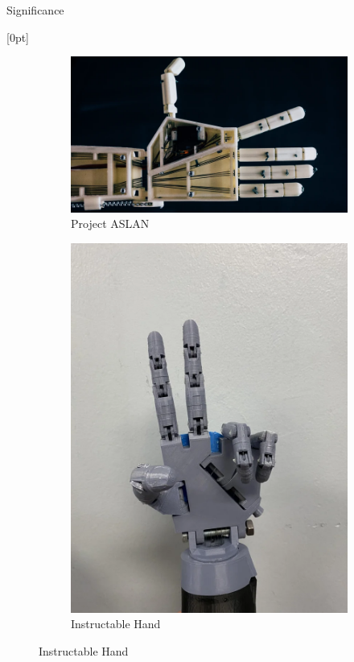 \documentclass[final, 20pt]{beamer}
\newlength{\colwidth}
\newlength{\twocolwidth}
\begin{document}
\begin{frame}[t]
\begin{columns}[t]
    \begin{column}{\twocolwidth}
      \begin{block}{Significance}
        \begin{minipage}[t]{0.48\linewidth}
          [0pt]
          \begin{figure}[ht]
            \centering
            \begin{subfigure}[b]{0.45\linewidth}
              \centering
              \includegraphics[width=\linewidth]{images/aslan.png}
              \caption{Project ASLAN}
              \label{fig:aslan}
            \end{subfigure}
            \begin{subfigure}[b]{0.45\linewidth}
              \centering
              \includegraphics[width=0.425\linewidth]{images/instructable-hand.png}
              \caption{Instructable Hand}
              \label{fig:instructable-hand}
            \end{subfigure}
          \end{figure}
          \vspace{-1em}


\end{minipage}
\end{block}
\end{column}
\end{columns}
\end{frame}
\end{document}
